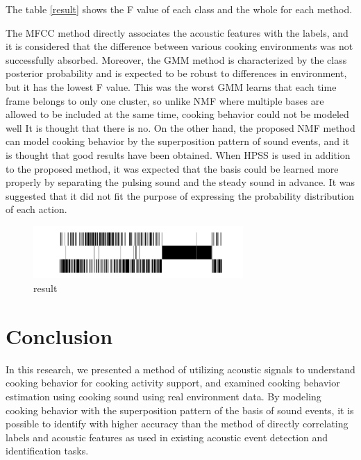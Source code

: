 \documentclass[sigchi]{acmart}
\begin{document}
The table \ref{result} shows the F value of each class and the whole for each method.

The MFCC method directly associates the acoustic features with the labels, and it is considered that the difference between various cooking environments was not successfully absorbed.
Moreover, the GMM method is characterized by the class posterior probability and is expected to be robust to differences in environment, but it has the lowest F value. This was the worst%
GMM learns that each time frame belongs to only one cluster, so unlike NMF where multiple bases are allowed to be included at the same time, cooking behavior could not be modeled well It is thought that there is no.
On the other hand, the proposed NMF method can model cooking behavior by the superposition pattern of sound events, and it is thought that good results have been obtained.
When HPSS is used in addition to the proposed method, it was expected that the basis could be learned more properly by separating the pulsing sound and the steady sound in advance. It was suggested that it did not fit the purpose of expressing the probability distribution of each action.

\begin{figure}[h]
  \centering
  \includegraphics[width=8cm]{fig/N63_m4.pdf}
  \caption{result}
  \Description{}
  \label{baseine_timeline_result}
\end{figure}



\section{Conclusion}
In this research, we presented a method of utilizing acoustic signals to understand cooking behavior for cooking activity support, and examined cooking behavior estimation using cooking sound using real environment data.
By modeling cooking behavior with the superposition pattern of the basis of sound events, it is possible to identify with higher accuracy than the method of directly correlating labels and acoustic features as used in existing acoustic event detection and identification tasks.
\end{document}
